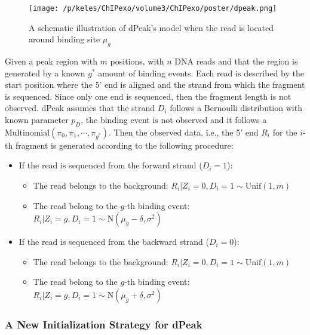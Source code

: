 \documentclass[11pt]{article}\usepackage[]{graphicx}\usepackage[]{color}
\begin{document}
\newpage

\begin{figure}[H]
  \centering
  \texttt{[image: /p/keles/ChIPexo/volume3/ChIPexo/poster/dpeak.png]}
  \caption{A schematic illustration of dPeak's model when the read is
    located around binding site $\mu_g$}
\end{figure}

Given a peak region with $m$ positions, with $n$ DNA reads and that
the region is generated by a known $g^*$ amount of binding
events. Each read is described by the start position where the 5' end
is aligned and the strand from which the fragment is sequenced. Since
only one end is sequenced, then the fragment length is not
observed. dPeak assumes that the strand $D_i$ follows a Bernoulli
distribution with known parameter $p_D$, the binding event is not
observed and it follows a
$\mbox{Multinomial}(\pi_0,\pi_1,\cdots,\pi_{g^*})$. Then the observed
data, i.e., the 5' end $R_i$ for the $i$-th fragment is generated
according to the following procedure:

\begin{itemize}
\item If the read is sequenced from the forward strand ($D_i = 1$):
  \begin{itemize}
  \item The read belongs to the background: $R_i | Z_i = 0, D_i = 1
    \sim \mbox{Unif}(1, m)$
  \item The read belong to the $g$-th binding event: $R_i | Z_i = g,
    D_i = 1 \sim \mbox{N}(\mu_g - \delta , \sigma^2)$
  \end{itemize}
\item If the read is sequenced from the backward strand ($D_i =
  0$):
  \begin{itemize}
  \item The read belongs to the background: $R_i | Z_i = 0, D_i = 1
    \sim \mbox{Unif}(1 , m)$
  \item The read belong to the $g$-th binding event: $R_i | Z_i = g,
    D_i = 1 \sim \mbox{N}(\mu_g + \delta , \sigma^2)$
  \end{itemize}
  
\end{itemize}

\subsubsection{A New Initialization Strategy for dPeak}
\label{sec:algo}
\end{document}

